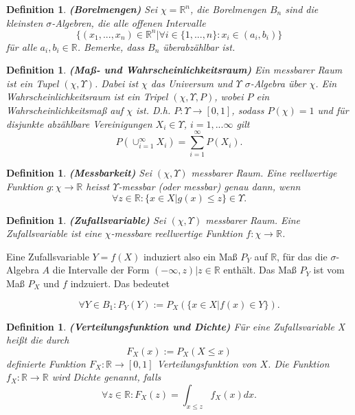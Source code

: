 \documentclass[12pt,a4paper]{scrartcl}
\newtheorem{Definition}[Satz]{Definition}
\numberwithin{equation}{section}
\newcommand{\R}{\mathbb{R}} %
\begin{document}
\begin{Definition}\textbf{(Borelmengen)}
 Sei $\chi = \R^{n}$, die Borelmengen $B_{n}$ sind die kleinsten $\sigma$-Algebren, die alle 
 offenen Intervalle 
 $$
 \textit{\{}(x_{1},...,x_{n})\in \R^{n} | \forall i \in \textit{\{}1,...,n\textit{\}}: x_{i} \in (a_{i},b_{i})\textit{\}}
 $$
 für alle $a_{i},b_{i} \in \R$. Bemerke, dass $B_{n}$ überabzählbar ist. 
\end{Definition}

\begin{Definition}\textbf{(Maß- und Wahrscheinlichkeitsraum)}
 Ein messbarer Raum ist ein Tupel $(\chi,\varUpsilon)$. Dabei ist $\chi$ das Universum und 
 $\varUpsilon$ $\sigma$-Algebra über $\chi$. Ein Wahrscheinlichkeitsraum ist ein Tripel $(\chi,\varUpsilon,P)$,
 wobei $P$ ein Wahrscheinlichkeitsmaß auf $\chi$ ist. D.h. $P: \varUpsilon \rightarrow [0,1]$, sodass
 $P(\chi) = 1$ und für disjunkte abzählbare Vereinigungen $X_{i} \in \varUpsilon$, $i= 1,...\infty$ gilt
 $$
 P(\cup_{i=1}^{\infty}X_{i}) = \sum_{i=1}^{\infty}P(X_{i}).
 $$
 \end{Definition}

\begin{Definition}\textbf{(Messbarkeit)}
 Sei $(\chi,\varUpsilon)$ messbarer Raum. Eine reellwertige Funktion $g: \chi \rightarrow \R$
 heisst $\varUpsilon$-messbar (oder messbar) genau dann, wenn 
 $$
 \forall z \in \R: \textit{\{} x \in X | g(x) \leq z \textit{\}} \in \varUpsilon.
 $$
 \end{Definition}

\begin{Definition}\textbf{(Zufallsvariable)}
Sei $(\chi,\varUpsilon)$ messbarer Raum. Eine Zufallsvariable ist eine $\chi$-messbare reellwertige
Funktion $f: \chi \rightarrow \R$.
\end{Definition}

Eine Zufallsvariable $Y = f(X)$ induziert also ein Maß $P_{Y}$ auf $\R$, für das die 
$\sigma$-Algebra $A$ die Intervalle der Form {$(-\infty,z)|z \in \R$} enthält. Das Maß 
$P_{Y}$ ist vom Maß $P_{X}$ und $f$ indzuiert. Das bedeutet

$$
\forall Y \in B_{1}: P_{Y}(Y) := P_{X}(\textit{\{} x \in X | f(x) \in Y \textit{\}}).
$$

\begin{Definition}\textbf{(Verteilungsfunktion und Dichte)}
Für eine Zufallsvariable X heißt die durch 
$$
F_{X}(x) := P_{X}(X \leq x)
$$
definierte Funktion $F_{X}: \R \rightarrow [0,1]$ Verteilungsfunktion von $X$.
Die Funktion $f_{X}: \R \rightarrow \R$ wird Dichte genannt, falls 
$$
\forall z \in \R: F_{X}(z) = \int_{x \leq z} f_{X}(x) dx. 
$$
\end{Definition}
\end{document}
